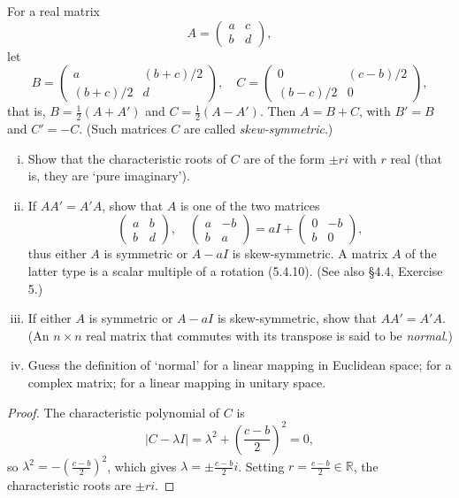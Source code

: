 \begin{tcolorbox}[title=Problem 2, breakable]
For a real matrix
\[
A = \begin{pmatrix} a & c \\ b & d \end{pmatrix},
\]
let
\[
B = \begin{pmatrix} a & (b+c)/2 \\ (b+c)/2 & d \end{pmatrix}, \quad
C = \begin{pmatrix} 0 & (c-b)/2 \\ (b-c)/2 & 0 \end{pmatrix},
\]
that is, $B = \frac{1}{2}(A + A')$ and $C = \frac{1}{2}(A - A')$. Then $A = B + C$, with $B' = B$ and $C' = -C$. (Such matrices $C$ are called \textit{skew-symmetric}.)
\begin{enumerate}[(i)]
    \item Show that the characteristic roots of $C$ are of the form $\pm ri$ with $r$ real (that is, they are `pure imaginary').
    \item If $AA' = A'A$, show that $A$ is one of the two matrices
    \[
    \begin{pmatrix} a & b \\ b & d \end{pmatrix}, \quad
    \begin{pmatrix} a & -b \\ b & a \end{pmatrix} = aI + \begin{pmatrix} 0 & -b \\ b & 0 \end{pmatrix},
    \]
    thus either $A$ is symmetric or $A - aI$ is skew-symmetric. A matrix $A$ of the latter type is a scalar multiple of a rotation (5.4.10). (See also \S4.4, Exercise 5.)
    \item If either $A$ is symmetric or $A - aI$ is skew-symmetric, show that $AA' = A'A$. (An $n \times n$ real matrix that commutes with its transpose is said to be \textit{normal}.)
    \item Guess the definition of `normal' for a linear mapping in Euclidean space; for a complex matrix; for a linear mapping in unitary space.
\end{enumerate}
\end{tcolorbox}

\begin{proof}
    The characteristic polynomial of $C$ is
    \[
    |C - \lambda I| = \lambda^2 + \left(\frac{c-b}{2}\right)^2 = 0,
    \]
    so $\lambda^2 = -\left(\frac{c-b}{2}\right)^2$, which gives $\lambda = \pm \frac{c-b}{2}i$. Setting $r = \frac{c-b}{2} \in \mathbb{R}$, the characteristic roots are $\pm ri$.
\end{proof}

